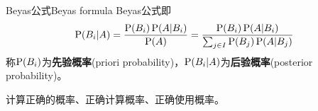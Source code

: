 \begin{theorem}{Beyas公式}{Beyas formula}
	Beyas公式即
	\begin{equation}
		\P(B_i|A)=\frac{\P(B_i)\P(A|B_i)}{\P(A)}=\frac{\P(B_i)\P(A|B_i)}{\sum_{j\in I}\P(B_j)\P(A|B_j)}
	\end{equation}
	称$\P(B_i)$为\textbf{先验概率}(priori probability)，$\P(B_i|A)$为\textbf{后验概率}(posterior probability)。
\end{theorem}


\begin{remark}
	计算正确的概率、正确计算概率、正确使用概率。
\end{remark}
